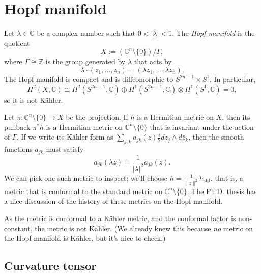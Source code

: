\documentclass[11pt]{article}
\newcommand{\kk}[1]{\mathbb{#1}}
\begin{document}
\section{Hopf manifold}
\label{sec:org8f5818e}

Let \(\lambda \in \kk C\) be a complex number such that \(0 < |\lambda| < 1\). The \emph{Hopf manifold} is the quotient
$$
X := (\kk C^n \setminus \{0\}) / \Gamma,
$$
where \(\Gamma \cong \kk Z\) is the group generated by \(\lambda\) that acts by
$$
\lambda \cdot (z_1, \ldots, z_n) = (\lambda z_1, \ldots, \lambda z_n).
$$
The Hopf manifold is compact and is diffeomorphic to \(S^{2n-1} \times S^1\). In particular,
$$
H^2(X, \kk C) \cong H^2(S^{2n-1}, \kk C) \oplus H^1(S^{2n-1}, \kk C) \otimes H^1(S^1, \kk C) = 0,
$$
so it is not K\"ahler.

Let \(\pi : \kk C^n \setminus \{0\} \to X\) be the projection. If \(h\) is a Hermitian metric on \(X\), then its pullback \(\pi^*h\) is a Hermitian metric on \(\kk C^n \setminus \{0\}\) that is invariant under the action of \(\Gamma\). If we write its K\"ahler form as \(\sum_{j,k} a_{jk}(z) \tfrac{i}{2} dz_j \wedge d\bar z_k\), then the smooth functions \(a_{jk}\) must satisfy
$$
a_{jk}(\lambda z) = \frac{1}{|\lambda|^2} a_{jk}(z).
$$
We can pick one such metric to inspect; we'll choose \(h = \frac{1}{\|z\|^2} h_{\mathrm{std}}\), that is, a metric that is conformal to the standard metric on \(\kk C^n \setminus \{0\}\). The Ph.D. thesis \cite{istrati:tel-02156198} has a nice discussion of the history of these metrics on the Hopf manifold.

As the metric is conformal to a K\"ahler metric, and the conformal factor is non-constant, the metric is not K\"ahler. (We already knew this because \emph{no} metric on the Hopf manifold is K\"ahler, but it's nice to check.)


\subsection{Curvature tensor}
\label{sec:org96d544d}
\end{document}
